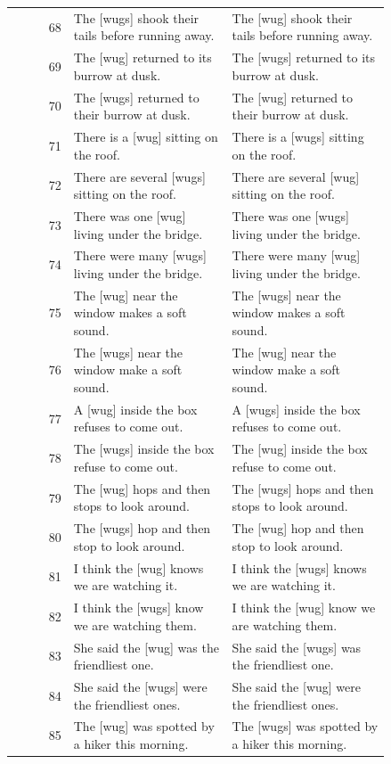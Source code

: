 \begin{longtable}{@{}rp{0.42\linewidth}p{0.42\linewidth}@{}}
68 & The {[}wugs{]} shook their tails before running away. & The {[}wug{]} shook their tails before running away. \\
69 & The {[}wug{]} returned to its burrow at dusk. & The {[}wugs{]} returned to its burrow at dusk. \\
70 & The {[}wugs{]} returned to their burrow at dusk. & The {[}wug{]} returned to their burrow at dusk. \\
71 & There is a {[}wug{]} sitting on the roof. & There is a {[}wugs{]} sitting on the roof. \\
72 & There are several {[}wugs{]} sitting on the roof. & There are several {[}wug{]} sitting on the roof. \\
73 & There was one {[}wug{]} living under the bridge. & There was one {[}wugs{]} living under the bridge. \\
74 & There were many {[}wugs{]} living under the bridge. & There were many {[}wug{]} living under the bridge. \\
75 & The {[}wug{]} near the window makes a soft sound. & The {[}wugs{]} near the window makes a soft sound. \\
76 & The {[}wugs{]} near the window make a soft sound. & The {[}wug{]} near the window make a soft sound. \\
77 & A {[}wug{]} inside the box refuses to come out. & A {[}wugs{]} inside the box refuses to come out. \\
78 & The {[}wugs{]} inside the box refuse to come out. & The {[}wug{]} inside the box refuse to come out. \\
79 & The {[}wug{]} hops and then stops to look around. & The {[}wugs{]} hops and then stops to look around. \\
80 & The {[}wugs{]} hop and then stop to look around. & The {[}wug{]} hop and then stop to look around. \\
81 & I think the {[}wug{]} knows we are watching it. & I think the {[}wugs{]} knows we are watching it. \\
82 & I think the {[}wugs{]} know we are watching them. & I think the {[}wug{]} know we are watching them. \\
83 & She said the {[}wug{]} was the friendliest one. & She said the {[}wugs{]} was the friendliest one. \\
84 & She said the {[}wugs{]} were the friendliest ones. & She said the {[}wug{]} were the friendliest ones. \\
85 & The {[}wug{]} was spotted by a hiker this morning. & The {[}wugs{]} was spotted by a hiker this morning. \\

\end{longtable}

